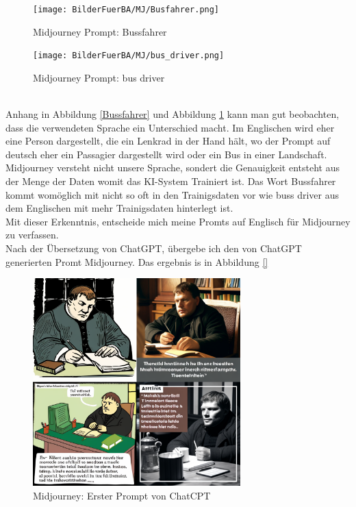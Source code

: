 \documentclass[10pt,a4paper,bibliography=totocnumbered,listof=totocnumbered]{scrartcl}
\begin{document}
\begin{figure}[h]
    \centering
    \begin{minipage}[t]{0.45\linewidth}
   	 \centering
   	 \texttt{[image: BilderFuerBA/MJ/Busfahrer.png]}
   	 \caption{Midjourney Prompt: Bussfahrer}
   	 \label{Bussfahrer}
    \end{minipage}
    \hfill
    \begin{minipage}[t]{0.45\linewidth}
   	 \centering
   	 \texttt{[image: BilderFuerBA/MJ/bus\_driver.png]}
   	 \caption{Midjourney Prompt: bus driver}
   	 \label{bus_driver}
    \end{minipage}
\end{figure}
\\
Anhang in Abbildung \ref{Bussfahrer} und Abbildung \ref{bus_driver} kann man gut beobachten, dass die verwendeten Sprache ein Unterschied macht. Im Englischen wird eher eine Person dargestellt, die ein Lenkrad in der Hand hält, wo der Prompt auf deutsch eher ein Passagier dargestellt wird oder ein Bus in einer Landschaft.
\\
Midjourney versteht nicht unsere Sprache, sondert die Genauigkeit entsteht aus der Menge der Daten womit das KI-System Trainiert ist. Das Wort Bussfahrer kommt womöglich mit nicht so oft in den Trainigsdaten vor wie buss driver aus dem Englischen mit mehr Trainigsdaten hinterlegt ist.
\\
Mit dieser Erkenntnis, entscheide mich meine Promts auf Englisch für Midjourney zu verfassen.
\\
Nach der Übersetzung von ChatGPT, übergebe ich den von ChatGPT generierten Promt Midjourney. Das ergebnis is in Abbildung \ref{}

\begin{figure}[h]
    \centering
    \includegraphics[width=8.022cm]{BilderFuerBA/MJ/MLaufEnglisch.png}
    \caption{Midjourney: Erster Prompt von ChatCPT}
    \label{Midjourney_erster_Prompt}
\end{figure}
\end{document}
